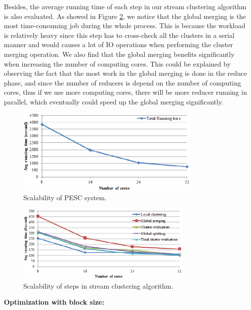 \documentclass[conference]{IEEEtran}
\begin{document}
Besides, the average running time of each step in our stream clustering algorithm is also evaluated. As showed in Figure \ref{fig_scalability_phase_cores}, we notice that the global merging is the most time-consuming job during the whole process. This is because the workload is relatively heavy since this step has to cross-check all the clusters in a serial manner and would causes a lot of IO operations when performing the cluster merging operation. We also find that the global merging benefits significantly when increasing the number of computing cores. This could be explained by observing the fact that the most work in the global merging is done in the reduce phase, and since the number of reducers is depend on the number of computing cores, thus if we use more computing cores, there will be more reducer running in parallel, which eventually could speed up the global merging significantly.

\begin{figure}[!t]
\centering
\includegraphics[height=1.65in]{./Figure/runningTime_cores.eps}
\caption{Scalability of PESC system.}
\label{fig_scalability_total_cores}
\end{figure}

\begin{figure}[!t]
\centering
\includegraphics[height=1.50in]{./Figure/phase_cores.eps}
\caption{Scalability of steps in stream clustering algorithm.}
\label{fig_scalability_phase_cores}
\end{figure}

\textbf{Optimization with block size: }
\end{document}
